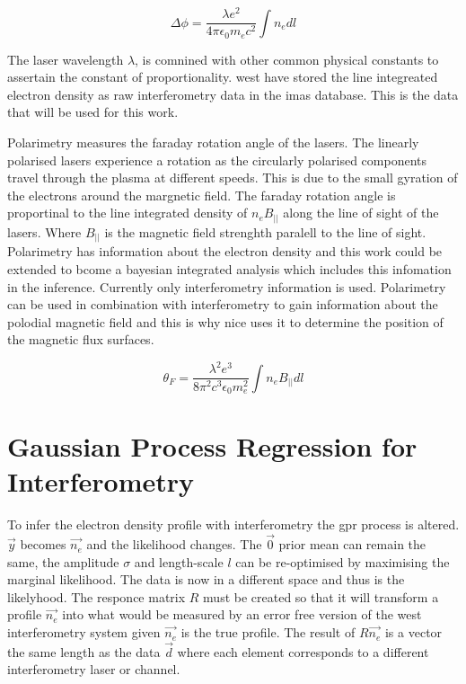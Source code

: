 \begin{equation} 
  \label{eq:int_phase}
  \Delta\phi = \frac{\lambda e^{2}}{4 \pi \epsilon_0 m_e c^2 } \int n_e dl
\end{equation}

The laser wavelength $\lambda$, is comnined with other common physical constants to assertain the constant of proportionality. \gls{west} have stored the line integreated electron density as raw interferometry data in the \gls{imas} database. This is the data that will be used for this work.

Polarimetry measures the faraday rotation angle of the lasers. The linearly polarised lasers experience a rotation as the circularly polarised components travel through the plasma at different speeds. This is due to the small gyration of the electrons around the margnetic field. The faraday rotation angle is proportinal to the line integrated density of $n_e B_{||}$ along the line of sight of the lasers. Where $B_{||}$ is the magnetic field strenghth paralell to the line of sight. Polarimetry has information about the electron density and this work could be extended to bcome a bayesian integrated analysis which includes this infomation in the inference. Currently only interferometry information is used. Polarimetry can be used in combination with interferometry to gain information about the polodial magnetic field and this is why \gls{nice} uses it to determine the position of the magnetic flux surfaces.

\begin{equation}
  \label{eq:pol_farad}
	\theta_F = \frac{\lambda^2 e^3}{8 \pi^2 c^3 \epsilon_0 m_e^2} \int n_e B_{||}dl
\end{equation}

\section{Gaussian Process Regression for Interferometry}

To infer the electron density profile with interferometry the \gls{gpr} process is altered. $\vec{y}$ becomes $\vec{n_e}$ and the likelihood changes. The $\vec{0}$ prior mean can remain the same, the amplitude $\sigma$ and length-scale $l$ can be re-optimised by maximising the marginal likelihood. The data is now in a different space and thus is the likelyhood. The responce matrix $R$ must be created so that it will transform a profile $\vec{n_e}$ into what would be measured by an error free version of the \gls{west} interferometry system given $\vec{n_e}$ is the true profile. The result of $R \vec{n_e}$ is a vector the same length as the data $\vec{d}$ where each element corresponds to a different interferometry laser or channel. 

